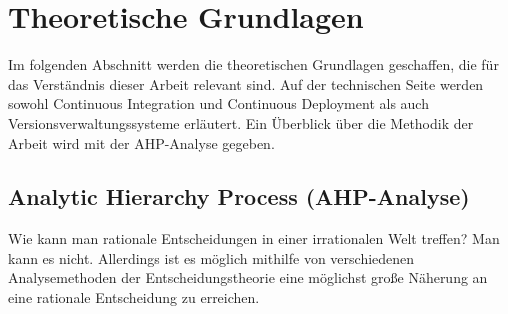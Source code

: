 \chapter{Theoretische Grundlagen} 
Im folgenden Abschnitt werden die theoretischen Grundlagen geschaffen, die für das Verständnis dieser Arbeit relevant sind. Auf der technischen Seite werden sowohl Continuous Integration und Continuous Deployment als auch Versionsverwaltungssysteme erläutert. Ein Überblick über die Methodik der Arbeit wird mit der AHP-Analyse gegeben.
\section{Analytic Hierarchy Process (AHP-Analyse)}
Wie kann man rationale Entscheidungen in einer irrationalen Welt treffen? Man kann es nicht. Allerdings ist es möglich mithilfe von verschiedenen Analysemethoden der Entscheidungstheorie eine möglichst große Näherung an eine rationale Entscheidung zu erreichen. 
